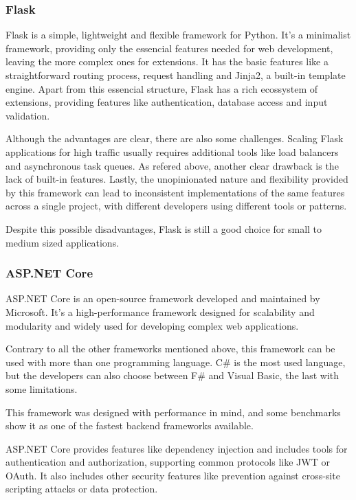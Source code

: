 \subsubsection{Flask}
Flask is a simple, lightweight and flexible framework for Python. It's a
minimalist framework, providing only the essencial features needed for
web development, leaving the more complex ones for extensions. It has the basic
features like a straightforward routing process, request handling and Jinja2,
a built-in template engine. Apart from this essencial structure, Flask has a
rich ecossystem of extensions, providing features like authentication,
database access and input validation.

Although the advantages are clear, there are also some challenges. Scaling
Flask applications for high traffic usually requires additional tools like load
balancers and asynchronous task queues. As refered above, another clear
drawback is the lack of built-in features. Lastly, the unopinionated nature and
flexibility provided by this framework can lead to inconsistent implementations
of the same features across a single project, with different developers using
different tools or patterns.

Despite this possible disadvantages, Flask is still a good choice for small to
medium sized applications.

\subsubsection{ASP.NET Core}
ASP.NET Core is an open-source framework developed and maintained by Microsoft.
It's a high-performance framework designed for scalability and modularity and
widely used for developing complex web applications.

Contrary to all the other frameworks mentioned above, this framework can be
used with more than one programming language. C\# is the most used language, but
the developers can also choose between F\# and Visual Basic, the last with some
limitations.

This framework was designed with performance in mind, and some benchmarks show
it as one of the fastest backend frameworks available.

ASP.NET Core provides features like dependency injection and includes tools for
authentication and authorization, supporting common protocols like \gls{JWT} or OAuth.
It also includes other security features like prevention against cross-site
scripting attacks or data protection.

